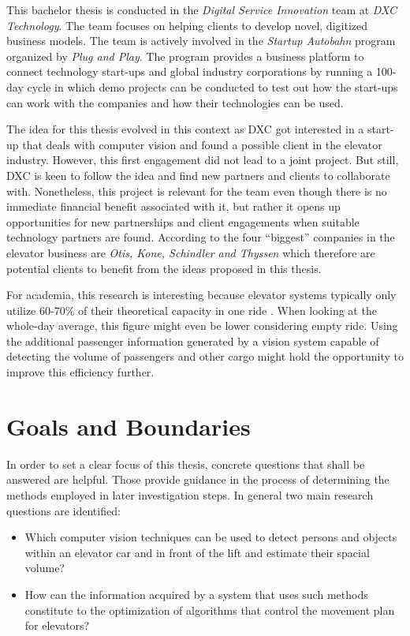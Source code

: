 This bachelor thesis is conducted in the \emph{Digital Service Innovation} team at \emph{DXC Technology}.
The team focuses on helping clients to develop novel, digitized business models.
The team is actively involved in the \emph{Startup Autobahn} program organized by \emph{Plug and Play}.
The program provides a business platform to connect technology start-ups and global industry corporations
by running a 100-day cycle in which demo projects can be conducted to test out how the start-ups can work with the companies and how their technologies can be used.

The idea for this thesis evolved in this context as DXC got interested in a start-up that deals with computer vision and found a possible client in the elevator industry.
However, this first engagement did not lead to a joint project.
But still, DXC is keen to follow the idea and find new partners and clients to collaborate with.
Nonetheless, this project is relevant for the team even though there is no immediate financial benefit associated with it, 
but rather it opens up opportunities for new partnerships and client engagements when suitable technology partners are found.
According to \textcite[][p.~4]{unger2015aufzuege} the four \enquote{biggest} companies in the elevator business are \emph{Otis, Kone, Schindler and Thyssen} which therefore are potential clients to benefit from the ideas proposed in this thesis.

For academia, this research is interesting because elevator systems typically only utilize
60-70\% of their theoretical capacity in one ride \autocite[][p.~194]{unger2015aufzuege}. 
When looking at the whole-day average, this figure might even be lower considering empty ride.
Using the additional passenger information generated by a vision system capable of detecting the volume of passengers and other cargo might hold the opportunity to improve this efficiency further.

\section{Goals and Boundaries}
\label{sec:intro:goals}

In order to set a clear focus of this thesis, concrete questions that shall be answered are helpful.
Those provide guidance in the process of determining the methods employed in later investigation steps.
In general two main research questions are identified:

\begin{itemize}
    \item Which computer vision techniques can be used to detect persons and objects within an elevator car and in front of the lift and estimate their spacial volume?
    \item How can the information acquired by a system that uses such methods constitute to the optimization of algorithms that control the movement plan for elevators?
\end{itemize}

